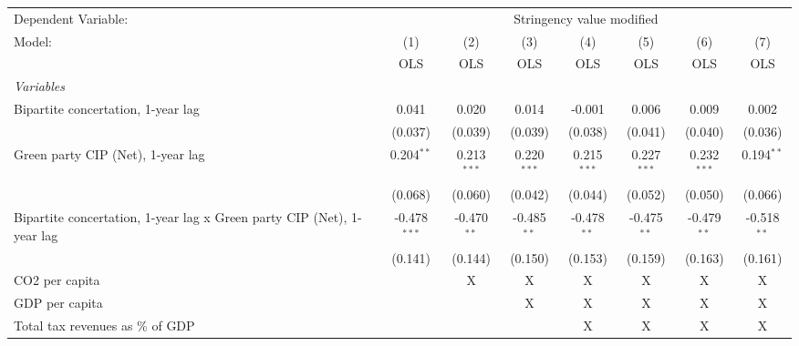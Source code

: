 
\begingroup
\centering
\begin{tabular}{lccccccc}
   \toprule
   Dependent Variable: & \multicolumn{7}{c}{Stringency value modified}\\
   Model:                                                                 & (1)            & (2)           & (3)           & (4)           & (5)           & (6)           & (7)\\  
                                                                          &  OLS           & OLS           & OLS           & OLS           & OLS           & OLS           & OLS\\  
   \midrule
   \emph{Variables}\\
   Bipartite concertation, 1-year lag                                     & 0.041          & 0.020         & 0.014         & -0.001        & 0.006         & 0.009         & 0.002\\   
                                                                          & (0.037)        & (0.039)       & (0.039)       & (0.038)       & (0.041)       & (0.040)       & (0.036)\\   
   Green party CIP (Net), 1-year lag                                      & 0.204$^{**}$   & 0.213$^{***}$ & 0.220$^{***}$ & 0.215$^{***}$ & 0.227$^{***}$ & 0.232$^{***}$ & 0.194$^{**}$\\   
                                                                          & (0.068)        & (0.060)       & (0.042)       & (0.044)       & (0.052)       & (0.050)       & (0.066)\\   
   Bipartite concertation, 1-year lag x Green party CIP (Net), 1-year lag & -0.478$^{***}$ & -0.470$^{**}$ & -0.485$^{**}$ & -0.478$^{**}$ & -0.475$^{**}$ & -0.479$^{**}$ & -0.518$^{**}$\\   
                                                                          & (0.141)        & (0.144)       & (0.150)       & (0.153)       & (0.159)       & (0.163)       & (0.161)\\   
   CO2 per capita                                                         &                & X             & X             & X             & X             & X             & X\\  
   GDP per capita                                                         &                &               & X             & X             & X             & X             & X\\  
   Total tax revenues as \% of GDP                                        &                &               &               & X             & X             & X             & X\\  

\end{tabular}
